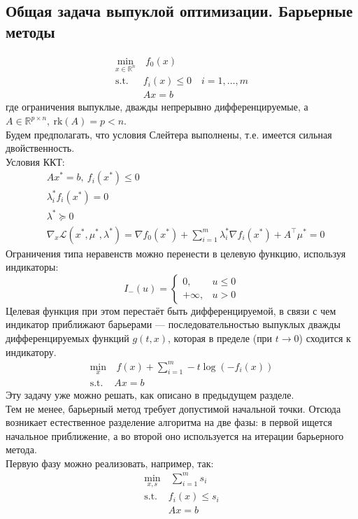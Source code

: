 \documentclass[11pt,a4paper]{report}
\def\Real{\mathbb{R}}
\def\le{\leqslant}
\theoremstyle{definition}
\theoremstyle{definition}
\theoremstyle{definition}
\begin{document}
	\subsection{Общая задача выпуклой оптимизации. Барьерные методы}
	\begin{align*}
		\min_{x \in \Real^n}&\ f_0(x)\\
		\text{s.t. }& f_i(x) \le 0\quad i = 1,\ldots,m\\
								& Ax = b
	\end{align*}
	где ограничения выпуклые, дважды непрерывно дифференцируемые, а $ A \in \Real^{p \times n},\ \mathrm{rk}(A) = p < n $.\\
	Будем предполагать, что условия Слейтера выполнены, т.е. имеется сильная двойственность.\\
	Условия ККТ:
	\begin{align*}
		&Ax^* = b,\ f_i(x^*) \le 0\\
		&\lambda_i^* f_i(x^*) = 0\\
		&\lambda^* \succeq 0\\
		&\nabla_{x} \mathcal{L}(x^*, \mu^*, \lambda^*) = \nabla f_0(x^*) + \sum_{i=1}^{m} \lambda_i^* \nabla f_i(x^*) + A^\top \mu^{*} = 0
	\end{align*}
	Ограничения типа неравенств можно перенести в целевую функцию, используя индикаторы:
	$$
		I_{-}(u) = \begin{cases}
			0, & u \le 0\\
			+\infty, & u > 0
		\end{cases}
	$$
	Целевая функция при этом перестаёт быть дифференцируемой, в связи с чем индикатор приближают барьерами — последовательностью выпуклых дважды дифференцируемых функций $ g(t, x) $, которая в пределе (при $ t \to 0 $) сходится к индикатору.
	\begin{align*}
		\min_{x}&\ f(x) + \sum_{i=1}^{m} -t\log (-f_i(x))\\
		\text{s.t. }& Ax = b
	\end{align*}
	Эту задачу уже можно решать, как описано в предыдущем разделе.\\
	Тем не менее, барьерный метод требует допустимой начальной точки. Отсюда возникает естественное разделение алгоритма на две фазы: в первой ищется начальное приближение, а во второй оно используется на итерации барьерного метода.\\
	Первую фазу можно реализовать, например, так:
	\begin{align*}
		\min_{x,s}&\ \sum_{i=1}^{m} s_i\\
		\text{s.t. }& f_i(x) \le s_i\\
								& Ax = b
	\end{align*}
\end{document}
